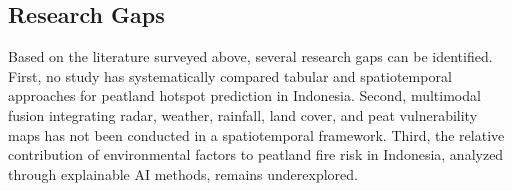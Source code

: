 \documentclass{article}
\begin{document}
\subsection{Research Gaps}

Based on the literature surveyed above, several research gaps can be
identified. First, no study has systematically compared tabular and
spatiotemporal approaches for peatland hotspot prediction in Indonesia.
Second, multimodal fusion integrating radar, weather, rainfall, land cover,
and peat vulnerability maps has not been conducted in a spatiotemporal
framework. Third, the relative contribution of environmental factors to
peatland fire risk in Indonesia, analyzed through explainable AI methods,
remains underexplored.



\end{document}
